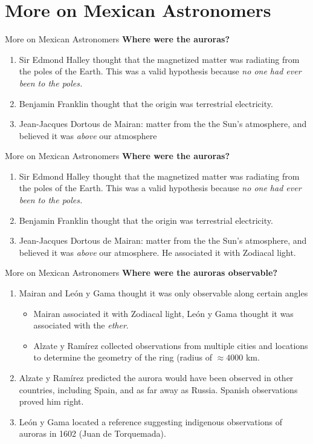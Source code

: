 \documentclass{beamer}
\begin{document}
\section{More on Mexican Astronomers}

\begin{frame}{More on Mexican Astronomers}
\textbf{Where were the auroras?}
\begin{enumerate}
\item Sir Edmond Halley thought that the magnetized matter was radiating from the poles of the Earth.  This was a valid hypothesis because \textit{no one had ever been to the poles.}
\item Benjamin Franklin thought that the origin was terrestrial electricity.
\item Jean-Jacques Dortous de Mairan: matter from the the Sun's atmosphere, and believed it was \textit{above} our atmosphere
\end{enumerate}
\end{frame}

\begin{frame}{More on Mexican Astronomers}
\textbf{Where were the auroras?}
\begin{enumerate}
\item Sir Edmond Halley thought that the magnetized matter was radiating from the poles of the Earth.  This was a valid hypothesis because \textit{no one had ever been to the poles.}
\item Benjamin Franklin thought that the origin was terrestrial electricity.
\item Jean-Jacques Dortous de Mairan: matter from the the Sun's atmosphere, and believed it was \textit{above} our atmosphere.  He associated it with Zodiacal light.
\end{enumerate}
\end{frame}

\begin{frame}{More on Mexican Astronomers}
\textbf{Where were the auroras observable?}
\begin{enumerate}
\item Mairan and Le\'{o}n y Gama thought it was only observable along certain angles
\begin{itemize}
\item Mairan associated it with Zodiacal light, Le\'{o}n y Gama thought it was associated with the \textit{ether}.
\item Alzate y Ram\'{i}rez collected observations from multiple cities and locations to determine the geometry of the ring (radius of $\approx 4000$ km.
\end{itemize}
\item Alzate y Ram\'{i}rez predicted the aurora would have been observed in other countries, including Spain, and as far away as Russia.  Spanish observations proved him right.
\item Le\'{o}n y Gama located a reference suggesting indigenous observations of auroras in 1602 (Juan de Torquemada).
\end{enumerate}
\end{frame}
\end{document}
